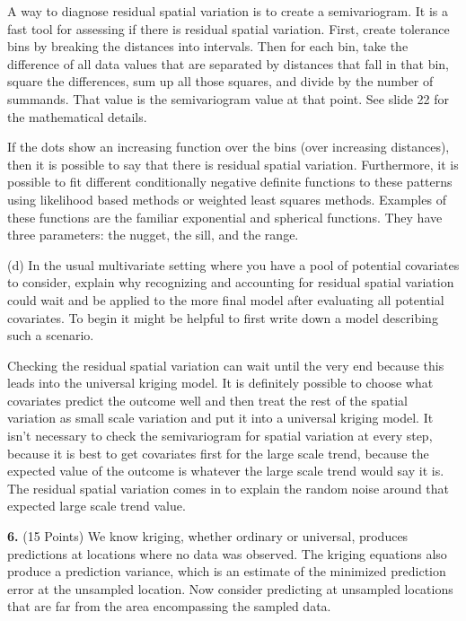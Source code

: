 \documentclass[letterpaper, 12pt]{article}
\begin{document}
{\sf
A way to diagnose residual spatial variation is to create a semivariogram. It is a fast tool for assessing if there is residual spatial variation. First, create tolerance bins by breaking the distances into intervals. Then for each bin, take the difference of all data values that are separated by distances that fall in that bin, square the differences, sum up all those squares, and divide by the number of summands. That value is the semivariogram value at that point. See slide 22 for the mathematical details.

If the dots show an increasing function over the bins (over increasing distances), then it is possible to say that there is residual spatial variation. Furthermore, it is possible to fit different conditionally negative definite functions to these patterns using likelihood based methods or weighted least squares methods. Examples of these functions are the familiar exponential and spherical functions. They have three parameters: the nugget, the sill, and the range.
}

(d) In the usual multivariate setting where you have a pool of potential covariates to consider, explain why recognizing and accounting for residual spatial variation could wait and be applied to the more final model after evaluating all potential covariates. To begin it might be helpful to first write down a model describing such a scenario.

{\sf
Checking the residual spatial variation can wait until the very end because this leads into the universal kriging model. It is definitely possible to choose what covariates predict the outcome well and then treat the rest of the spatial variation as small scale variation and put it into a universal kriging model. It isn't necessary to check the semivariogram for spatial variation at every step, because it is best to get covariates first for the large scale trend, because the expected value of the outcome is whatever the large scale trend would say it is. The residual spatial variation comes in to explain the random noise around that expected large scale trend value.
}

\textbf{6.} (15 Points)
We know kriging, whether ordinary or universal, produces predictions at locations where no data was observed. The kriging equations also produce a prediction variance, which is an estimate of the minimized prediction error at the unsampled location. Now consider predicting at unsampled locations that are far from the area encompassing the sampled data. 
\end{document}
